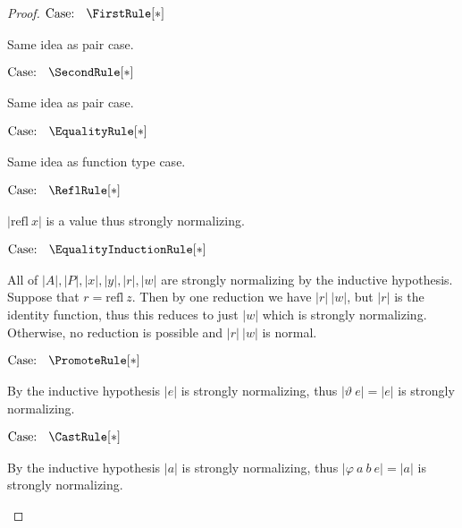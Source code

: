 \begin{proof}
    $\text{Case: }\begin{array}{c} \FirstRule[*] \end{array}$
    \begin{proofcase}
        Same idea as pair case.
    \end{proofcase}

    $\text{Case: }\begin{array}{c} \SecondRule[*] \end{array}$
    \begin{proofcase}
        Same idea as pair case.
    \end{proofcase}

    $\text{Case: }\begin{array}{c} \EqualityRule[*] \end{array}$
    \begin{proofcase}
        Same idea as function type case.
    \end{proofcase}
    
    $\text{Case: }\begin{array}{c} \ReflRule[*] \end{array}$
    \begin{proofcase}
        $|\text{refl}\ x|$ is a value thus strongly normalizing.
    \end{proofcase}

    $\text{Case: }\begin{array}{c} \EqualityInductionRule[*] \end{array}$
    \begin{proofcase}
        All of $|A|, |P|, |x|, |y|, |r|, |w|$ are strongly normalizing by the inductive hypothesis.
        Suppose that $r = \text{refl}\ z$.
        Then by one reduction we have $|r|\ |w|$, but $|r|$ is the identity function, thus this reduces to just $|w|$ which is strongly normalizing.
        Otherwise, no reduction is possible and $|r|\ |w|$ is normal.
    \end{proofcase}

    $\text{Case: }\begin{array}{c} \PromoteRule[*] \end{array}$
    \begin{proofcase}
        By the inductive hypothesis $|e|$ is strongly normalizing, thus $|\vartheta\ e| = |e|$ is strongly normalizing.
    \end{proofcase}

    $\text{Case: }\begin{array}{c} \CastRule[*] \end{array}$
    \begin{proofcase}
        By the inductive hypothesis $|a|$ is strongly normalizing, thus $|\varphi\ a\ b\ e| = |a|$ is strongly normalizing.
    \end{proofcase}


\end{proof}
